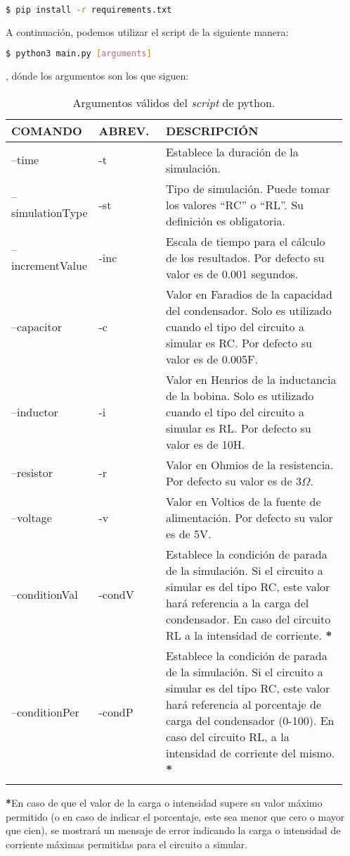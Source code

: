 \documentclass[../main.tex]{subfiles}
\begin{document}
\begin{lstlisting}[language=bash]
  $ pip install -r requirements.txt
\end{lstlisting}

A continuación, podemos utilizar el script de la siguiente manera:

\begin{lstlisting}[language=bash]
  $ python3 main.py [arguments]
\end{lstlisting}

, dónde los argumentos son los que siguen:

\begin{longtable}{|| p{0.2\linewidth} | p{0.2\linewidth} |  p{0.55\linewidth} ||}
  \hline
  \textbf{COMANDO} & \textbf{ABREV.} & \textbf{DESCRIPCIÓN} \\ \hline
  --time & -t & Establece la duración de la simulación.  \\ \hline

  --simulationType & -st & Tipo de simulación. Puede tomar los valores ``RC'' o ``RL''. Su definición es obligatoria. \\ \hline

  --incrementValue & -inc & Escala de tiempo para el cálculo de los resultados. Por defecto su valor es de 0.001 segundos. \\ \hline

  --capacitor & -c & Valor en Faradios de la capacidad del condensador. Solo es utilizado cuando el tipo del circuito a simular es RC. Por defecto su valor es de 0.005F. \\ \hline

  --inductor & -i & Valor en Henrios de la inductancia de la bobina. Solo es utilizado cuando el tipo del circuito a simular es RL. Por defecto su valor es de 10H. \\ \hline

  --resistor & -r & Valor en Ohmios de la resistencia. Por defecto su valor es de $3\Omega$. \\ \hline

  --voltage & -v & Valor en Voltios de la fuente de alimentación. Por defecto su valor es de 5V. \\ \hline

  --conditionVal & -condV & Establece la condición de parada de la simulación. Si el circuito a simular es del tipo RC, este valor hará referencia a la carga del condensador. En caso del circuito RL a la intensidad de corriente. \textbf{*} \\ \hline

  --conditionPer & -condP & Establece la condición de parada de la simulación. Si el circuito a simular es del tipo RC, este valor hará referencia al porcentaje de carga del condensador (0-100). En caso del circuito RL, a la intensidad de corriente del mismo. \textbf{*} \\ \hline




    
  \caption{Argumentos válidos del \textit{script} de python.}
  \label{tab::argumentos-script}
  

\end{longtable}

\textbf{*}En caso de que el valor de la carga o intensidad supere su valor máximo permitido (o en caso de indicar el porcentaje, este sea menor que cero o mayor que cien), se mostrará un mensaje de error indicando la carga o intensidad de corriente máximas permitidas para el circuito a simular.
\end{document}
